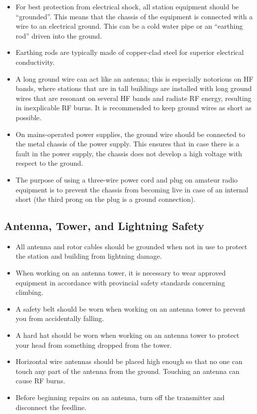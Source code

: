 \documentclass[letterpaper,12pt]{scrartcl}
\begin{document}
\begin{itemize}
\item For best protection from electrical shock, all station equipment should be ``grounded''. This means that the chassis of the equipment is connected with a wire to an electrical ground.
This can be a cold water pipe or an ``earthing rod'' driven into the ground.
\item Earthing rods are typically made of copper-clad steel for superior electrical conductivity.
\item A long ground wire can act like an antenna; this is especially notorious on HF bands, where stations that are in tall buildings are installed
with long ground wires that are resonant on several HF bands and radiate RF energy, resulting in inexplicable RF burns.
It is recommended to keep ground wires as short as possible.
\item On mains-operated power supplies, the ground wire should be connected to the metal chassis of the power supply.
This ensures that in case there is a fault in the power supply, the chassis does not develop a high voltage with respect to the ground.
\item The purpose of using a three-wire power cord and plug on amateur radio equipment is to prevent the chassis from becoming live
in case of an internal short (the third prong on the plug is a ground connection).
\end{itemize}

\subsection{Antenna, Tower, and Lightning Safety}

\begin{itemize}
\item All antenna and rotor cables should be grounded when not in use to protect the station and building from lightning damage.
\item When working on an antenna tower, it is necessary to wear approved equipment in accordance with provincial safety standards concerning climbing.
\item A safety belt should be worn when working on an antenna tower to prevent you from accidentally falling.
\item A hard hat should be worn when working on an antenna tower to protect your head from something dropped from the tower.
\item Horizontal wire antennas should be placed high enough so that no one can touch any part of the antenna from the ground.
Touching an antenna can cause RF burns.
\item Before beginning repairs on an antenna, turn off the transmitter and disconnect the feedline.
\end{itemize}
\end{document}

